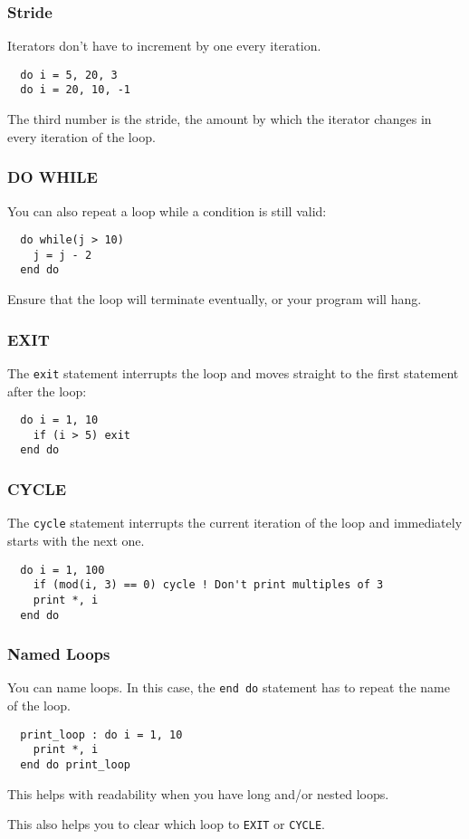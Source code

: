 \begin{frame}[fragile]
  \frametitle{Stride}

  Iterators don't have to increment by one every iteration.

  \begin{lstlisting}
  do i = 5, 20, 3   
  do i = 20, 10, -1
  \end{lstlisting}
  The third number is the stride, the amount by which the iterator
  changes in every iteration of the loop.

\end{frame}

\begin{frame}[fragile]
  \frametitle{DO WHILE}

  You can also repeat a loop while a condition is still valid:

  \begin{lstlisting}
  do while(j > 10)
    j = j - 2
  end do
  \end{lstlisting}

  Ensure that the loop will terminate eventually, or your program will hang.

\end{frame}

\begin{frame}[fragile]
  \frametitle{EXIT}

  The \texttt{exit} statement interrupts the loop and moves straight to the first
  statement after the loop:

  \begin{lstlisting}
  do i = 1, 10
    if (i > 5) exit
  end do
  \end{lstlisting}

\end{frame}

\begin{frame}[fragile]
  \frametitle{CYCLE}

  The \texttt{cycle} statement interrupts the current iteration of the loop
  and immediately starts with the next one.

  \begin{lstlisting}
  do i = 1, 100
    if (mod(i, 3) == 0) cycle ! Don't print multiples of 3
    print *, i
  end do
  \end{lstlisting}

\end{frame}

\begin{frame}[fragile]
  \frametitle{Named Loops}

  You can name loops.
  In this case, the \texttt{end do} statement has to repeat the name of the loop.

  \begin{lstlisting}
  print_loop : do i = 1, 10
    print *, i
  end do print_loop
  \end{lstlisting}

  This helps with readability when you have long and/or nested loops.

  This also helps you to clear which loop to \texttt{EXIT} or \texttt{CYCLE}.

\end{frame}

